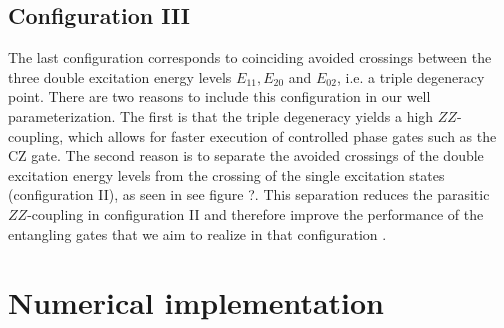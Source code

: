 \documentclass[twocolumn,superscriptaddress,unsortedaddress,
 amsmath,amssymb,
 aps,
]{revtex4-2}
\begin{document}

    \subsection{Configuration III}
        The last configuration corresponds to coinciding avoided crossings between the three double excitation energy levels $E_{11}, E_{20}$ and $E_{02}$, i.e. a triple degeneracy point. There are two reasons to include this configuration in our well parameterization. The first is that the triple degeneracy yields a high $ZZ$-coupling, which allows for faster execution of controlled phase gates such as the CZ gate. The second reason is to separate the avoided crossings of the double excitation energy levels from the crossing of the single excitation states (configuration II), as seen in see figure ?. This separation reduces the parasitic $ZZ$-coupling in configuration II and therefore improve the performance of the entangling gates that we aim to realize in that configuration \cite{triple-avoided-crossing}. 
    


\section{Numerical implementation}
\end{document}

